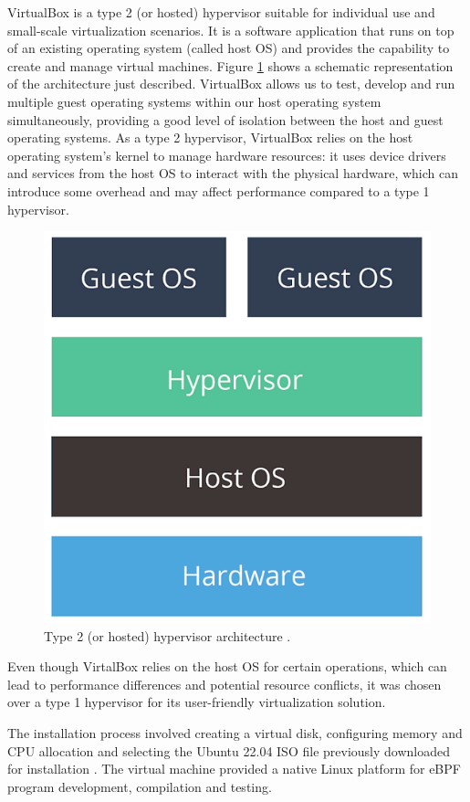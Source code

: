 VirtualBox is a type 2 (or hosted) hypervisor suitable for individual use and small-scale virtualization scenarios.
It is a software application that runs on top of an existing operating system (called host OS) and provides the capability to create and manage virtual machines. 
Figure \ref{fig:type_2_hypervisor} shows a schematic representation of the architecture just described.
VirtualBox allows us to test, develop and run multiple guest operating systems within our host operating system simultaneously, providing a good level of isolation between the host and guest operating systems.
As a type 2 hypervisor, VirtualBox relies on the host operating system's kernel to manage hardware resources: it uses device drivers and services from the host OS to interact with the physical hardware, which can introduce some overhead and may affect performance compared to a type 1 hypervisor.

\begin{figure}[h]
	\centering
	\includegraphics[width=0.7\linewidth]{images/Technologies/type_2_hypervisor.png}
	\caption{Type 2 (or hosted) hypervisor architecture \cite{HypervisorsArchitectures}.}
	\label{fig:type_2_hypervisor}
\end{figure}

Even though VirtalBox relies on the host OS for certain operations, which can lead to performance differences and potential resource conflicts, it was chosen over a type 1 hypervisor for its user-friendly virtualization solution.

The installation process involved creating a virtual disk, configuring memory and CPU allocation and selecting the Ubuntu 22.04 ISO file previously downloaded for installation \cite{UbuntuISOImage}. 
The virtual machine provided a native Linux platform for eBPF program development, compilation and testing.

